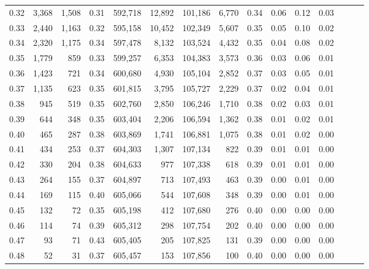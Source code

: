 \begin{tabular}{rrrrrrrrrrrrrrr}
0.32 &   3,368 &  1,508 &  0.31 &  592,718 &   12,892 &  101,186 &    6,770 &  0.34 &  0.06 &  0.12 &      0.03 \\
0.33 &   2,440 &  1,163 &  0.32 &  595,158 &   10,452 &  102,349 &    5,607 &  0.35 &  0.05 &  0.10 &      0.02 \\
0.34 &   2,320 &  1,175 &  0.34 &  597,478 &    8,132 &  103,524 &    4,432 &  0.35 &  0.04 &  0.08 &      0.02 \\
0.35 &   1,779 &    859 &  0.33 &  599,257 &    6,353 &  104,383 &    3,573 &  0.36 &  0.03 &  0.06 &      0.01 \\
0.36 &   1,423 &    721 &  0.34 &  600,680 &    4,930 &  105,104 &    2,852 &  0.37 &  0.03 &  0.05 &      0.01 \\
0.37 &   1,135 &    623 &  0.35 &  601,815 &    3,795 &  105,727 &    2,229 &  0.37 &  0.02 &  0.04 &      0.01 \\
0.38 &     945 &    519 &  0.35 &  602,760 &    2,850 &  106,246 &    1,710 &  0.38 &  0.02 &  0.03 &      0.01 \\
0.39 &     644 &    348 &  0.35 &  603,404 &    2,206 &  106,594 &    1,362 &  0.38 &  0.01 &  0.02 &      0.01 \\
0.40 &     465 &    287 &  0.38 &  603,869 &    1,741 &  106,881 &    1,075 &  0.38 &  0.01 &  0.02 &      0.00 \\
0.41 &     434 &    253 &  0.37 &  604,303 &    1,307 &  107,134 &      822 &  0.39 &  0.01 &  0.01 &      0.00 \\
0.42 &     330 &    204 &  0.38 &  604,633 &      977 &  107,338 &      618 &  0.39 &  0.01 &  0.01 &      0.00 \\
0.43 &     264 &    155 &  0.37 &  604,897 &      713 &  107,493 &      463 &  0.39 &  0.00 &  0.01 &      0.00 \\
0.44 &     169 &    115 &  0.40 &  605,066 &      544 &  107,608 &      348 &  0.39 &  0.00 &  0.01 &      0.00 \\
0.45 &     132 &     72 &  0.35 &  605,198 &      412 &  107,680 &      276 &  0.40 &  0.00 &  0.00 &      0.00 \\
0.46 &     114 &     74 &  0.39 &  605,312 &      298 &  107,754 &      202 &  0.40 &  0.00 &  0.00 &      0.00 \\
0.47 &      93 &     71 &  0.43 &  605,405 &      205 &  107,825 &      131 &  0.39 &  0.00 &  0.00 &      0.00 \\
0.48 &      52 &     31 &  0.37 &  605,457 &      153 &  107,856 &      100 &  0.40 &  0.00 &  0.00 &      0.00 \\

\end{tabular}
